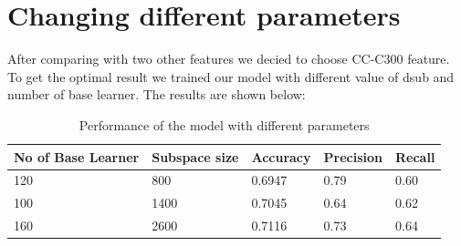 \section{Changing different parameters}
After comparing with two other features we decied to choose CC-C300 feature. To get the optimal result we trained our model with different value of dsub and number of base learner. The results are shown below:
\begin{table}[H]
    \centering
    \begin{tabular}{|l|l|l|l|l|}
    \hline
    No of  Base Learner & Subspace size & Accuracy & Precision & Recall \\ \hline
    120                 & 800           & 0.6947   &    0.79       &  0.60      \\ \hline
    100                 & 1400         & 0.7045   &    0.64       &   0.62     \\ \hline
    160                 & 2600         & 0.7116   &    0.73       &    0.64    \\ \hline
    \end{tabular}
    \caption{Performance of the model with different parameters}
\end{table}

